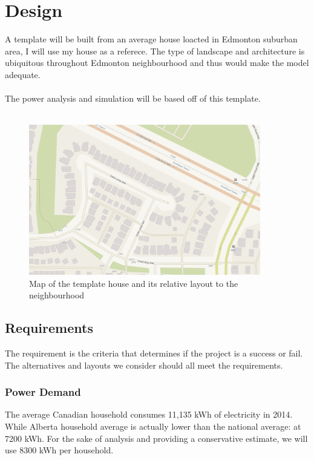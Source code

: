 \documentclass[10pt,letterpaper]{article}
\begin{document}
\section{Design}

A template will be built from an average house loacted in Edmonton suburban area, I will use my house as a referece. The type of landscape and architecture is ubiquitous throughout Edmonton neighbourhood and thus would make the model adequate.\\
\\
The power analysis and simulation will be based off of this template.\\
\\

\begin{figure}[H]
	\centering
	\includegraphics[width=0.9\textwidth]{assets/1534567367296}
	\caption{Map of the template house and its relative layout to the neighbourhood}
	\label{fig:template-house-path}
\end{figure}

\subsection{Requirements}\label{requriements}

The requirement is the criteria that determines if the project is a success or fail. The alternatives and layouts we consider should all meet the requirements.\\

\subsubsection{Power Demand}

The average Canadian household consumes 11,135 kWh of electricity in 2014\cite{residential-energy-use}. While Alberta household average is actually lower than the national average: at 7200 kWh. For the sake of analysis and providing a conservative estimate, we will use 8300 kWh per household.\cite{aeso-load-data, ieso-power-data, callmepower}\\
\end{document}
